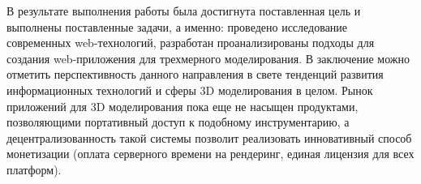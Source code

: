 В результате выполнения работы была достигнута поставленная цель и выполнены поставленные задачи, а именно: проведено исследование современных web-технологий,
разработан проанализированы подходы для создания web-приложения для трехмерного моделирования. В заключение можно отметить перспективность данного направления
в свете тенденций развития информационных технологий и сферы 3D моделирования в целом. Рынок приложений для 3D моделирования пока еще не насыщен продуктами,
позволяющими портативный доступ к подобному инструментарию, а децентрализованность такой системы позволит реализовать инновативный способ монетизации (оплата
серверного времени на рендеринг, единая лицензия для всех платформ).

